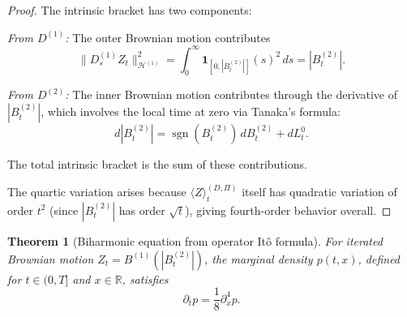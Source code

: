 \documentclass[12pt]{article}
\theoremstyle{plain}
\newtheorem{theorem}{Theorem}[section]
\theoremstyle{definition}
\theoremstyle{remark}
\newcommand{\R}{\mathbb{R}}
\newcommand{\HH}{\mathcal{H}}
\newcommand{\sgn}{\operatorname{sgn}}
\begin{document}
\begin{proof}
The intrinsic bracket has two components:

\emph{From $D^{(1)}$:} The outer Brownian motion contributes
\begin{equation}\label{eq:D1-contribution}
\|D_s^{(1)} Z_t\|_{\HH^{(1)}}^2 = \int_0^\infty \mathbf{1}_{[0, |B_t^{(2)}|]}(s)^2 \, ds = |B_t^{(2)}|.
\end{equation}

\emph{From $D^{(2)}$:} The inner Brownian motion contributes through the derivative of $|B_t^{(2)}|$, which involves the local time at zero via Tanaka's formula:
\begin{equation}\label{eq:Tanaka}
d|B_t^{(2)}| = \sgn(B_t^{(2)}) \, dB_t^{(2)} + dL_t^0.
\end{equation}

The total intrinsic bracket is the sum of these contributions.

The quartic variation arises because $\langle Z \rangle_t^{(D,\Pi)}$ itself has quadratic variation of order $t^2$ (since $|B_t^{(2)}|$ has order $\sqrt{t}$), giving fourth-order behavior overall.
\end{proof}

\begin{theorem}[Biharmonic equation from operator It\^{o} formula]\label{thm:biharmonic}
For iterated Brownian motion $Z_t = B^{(1)}(|B_t^{(2)}|)$, the marginal density $p(t,x)$, defined for $t \in (0,T]$ and $x \in \R$, satisfies
\begin{equation}\label{eq:biharmonic}
\partial_t p = \frac{1}{8}\partial_x^4 p.
\end{equation}
\end{theorem}
\end{document}
